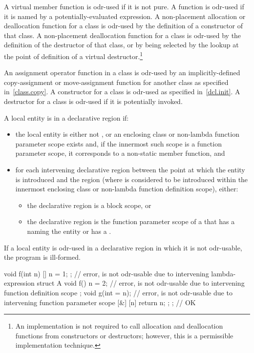 \pnum
A virtual member
function is odr-used if it is not pure.
A function is odr-used if it is named by a potentially-evaluated expression.
A non-placement allocation or deallocation
function for a class is odr-used by the definition of a constructor of that
class. A non-placement deallocation function for a class is odr-used by the
definition of the destructor of that class, or by being selected by the
lookup at the point of definition of a virtual
destructor.\footnote{An implementation is not required
to call allocation and
deallocation functions from constructors or destructors; however, this
is a permissible implementation technique.}

\pnum
An assignment operator function in a class is odr-used by an
implicitly-defined
copy-assignment or move-assignment function for another class as specified
in~\ref{class.copy}.
A constructor for a class is odr-used as specified
in~\ref{dcl.init}. A destructor for a class is odr-used if it is potentially
invoked.

\pnum
A local entity
is  in a declarative region if:

\begin{itemize}
\item the local entity is either
not , or
an enclosing class or non-lambda function parameter scope exists and,
if the innermost such scope is a function parameter scope,
it corresponds to a non-static member function, and
\item
for each intervening declarative region
between the point at which the entity is introduced and the region
(where  is considered to be introduced
within the innermost enclosing class or non-lambda function definition scope),
either:
\begin{itemize}
\item the declarative region is a block scope, or
\item the declarative region is the function parameter scope of a 
that has a  naming the entity or has a .
\end{itemize}
\end{itemize}

If a local entity is odr-used
in a declarative region in which it is not odr-usable,
the program is ill-formed.
\begin{example}
\begin{codeblock}
void f(int n) {
  [] { n = 1; };                // error,  is not odr-usable due to intervening lambda-expression
  struct A {
    void f() { n = 2; }         // error,  is not odr-usable due to intervening function definition scope
  };
  void g(int = n);              // error,  is not odr-usable due to intervening function parameter scope
  [&] { [n]{ return n; }; };    // OK
}
\end{codeblock}
\end{example}

